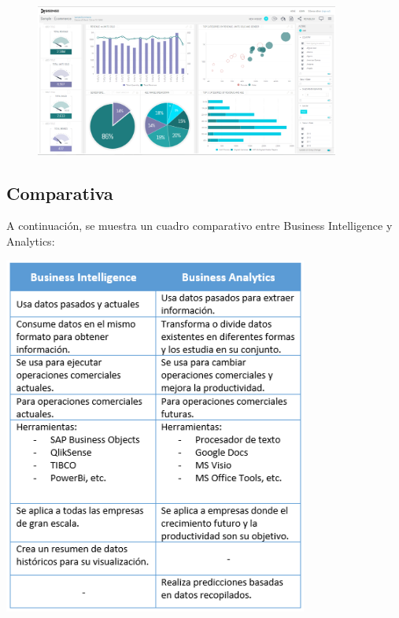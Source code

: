 \documentclass[%
 reprint,
 amsmath,amssymb,
 aps,
]{revtex4-1}
\begin{document}
\begin{figure}[htb]
\begin{center}
\includegraphics[width=10cm]{./Imagenes/anegocios}
\end{center}
\end{figure}


\subsection{Comparativa}
A continuación, se muestra un cuadro comparativo entre Business Intelligence y Analytics:
\begin{center}
\includegraphics[width=10cm]{./Imagenes/vs1} \cite{hub} \cite{e}
\end{center}
\end{document}

